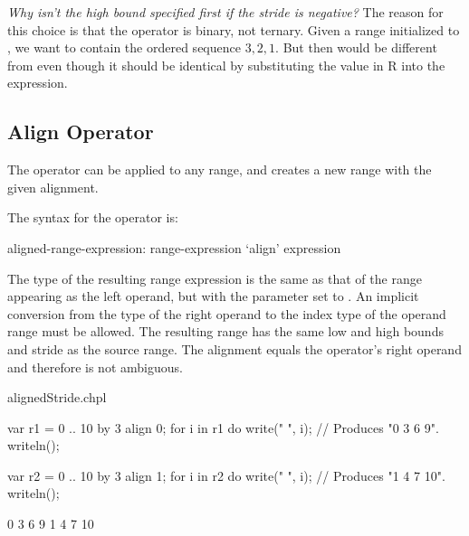 \begin{rationale}
{\it Why isn't the high bound specified first if the stride is
negative?}  The reason for this choice is that the  operator
is binary, not ternary.  Given a range  initialized
to , we want  to contain the ordered sequence
$3,2,1$.  But then  would be different from  even though it should be identical by substituting the value in
R into the expression.
\end{rationale}


\subsection{Align Operator}
\label{Align_Operator_For_Ranges}

The  operator can be applied to any range, and creates a new range
with the given alignment.  

The syntax for the  operator is:
\begin{syntax}
aligned-range-expression:
  range-expression `align' expression
\end{syntax}
\noindent The type of the resulting range expression is the same as that of the
range appearing as the left operand, but with the  parameter
set to .  An implicit conversion from
the type of the right operand to the index type of the operand range
must be allowed.
The resulting range has the
same low and high bounds and stride as the source range. The
alignment equals the  operator's right operand
and therefore is not ambiguous. 

\begin{chapelexample}{alignedStride.chpl}
\begin{chapel}
var r1 = 0 .. 10 by 3 align 0;
for i in r1 do
  write(" ", i);			// Produces "0 3 6 9".
writeln();

var r2 = 0 .. 10 by 3 align 1;
for i in r2 do
  write(" ", i);			// Produces "1 4 7 10".
writeln();
\end{chapel}
\begin{chapeloutput}
 0 3 6 9
 1 4 7 10
\end{chapeloutput}
\end{chapelexample}

